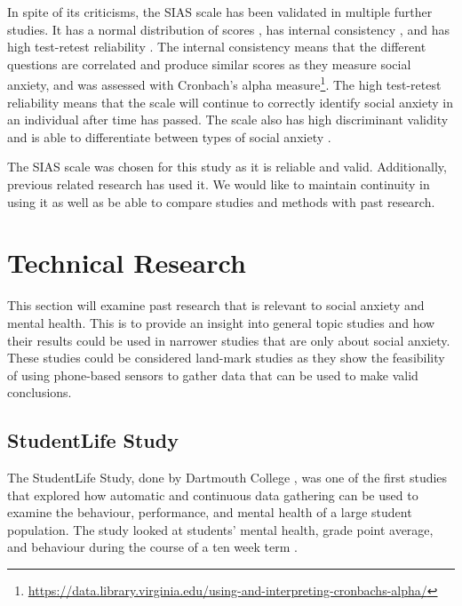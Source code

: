 \documentclass{l4proj}
\begin{document}
In spite of its criticisms, the SIAS scale has been validated in multiple further studies. It has a normal distribution of scores \citep{sias_origin}, has internal consistency \citep{sias_origin, comparing_sias_sps, consistency}, and has high test-retest reliability \citep{sias_origin}. The internal consistency means that the different questions are correlated and produce similar scores as they measure social anxiety, and was assessed with Cronbach's alpha measure\footnote{\url{https://data.library.virginia.edu/using-and-interpreting-cronbachs-alpha/}}. The high test-retest reliability means that the scale will continue to correctly identify social anxiety in an individual after time has passed. The scale also has high discriminant validity \citep{consistency} and is able to differentiate between types of social anxiety \citep{sias_origin, phobia_1}.

The SIAS scale was chosen for this study as it is reliable and valid. Additionally, previous related research \citep{boukhechba, boukhechba_2} has used it. We would like to maintain continuity in using it as well as be able to compare studies and methods with past research.

\section{Technical Research}
This section will examine past research that is relevant to social anxiety and mental health. This is to provide an insight into general topic studies and how their results could be used in narrower studies that are only about social anxiety. These studies could be considered land-mark studies as they show the feasibility of using phone-based sensors to gather data that can be used to make valid conclusions. 

\subsection{StudentLife Study} %
The StudentLife Study, done by Dartmouth College \citet{student_life_site}, was one of the first studies that explored how automatic and continuous data gathering can be used to examine the behaviour, performance, and mental health of a large student population. The study looked at students' mental health, grade point average, and behaviour during the course of a ten week term \citep{student_life_article}. 
\end{document}
